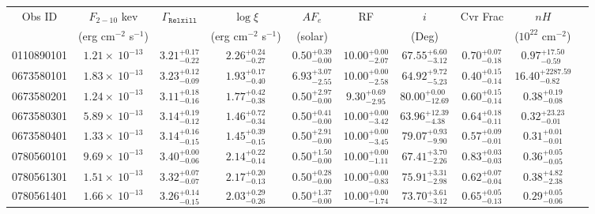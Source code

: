 \documentclass{article}
\begin{document}
\begin{landscape}
\begin{longtable}{cccccccccl}
\hline \multicolumn{1}{c}{Obs ID} & \multicolumn{1}{c}{$F_{2-10}$ kev} & \multicolumn{1}{c}{$\Gamma_\texttt{Relxill}$} & \multicolumn{1}{c}{$\log \xi$} & \multicolumn{1}{c}{$AF_e$} & \multicolumn{1}{c}{RF} & \multicolumn{1}{c}{$\textit{i}$} & \multicolumn{1}{c}{Cvr Frac} & \multicolumn{1}{c}{$nH$}\\  
\multicolumn{1}{c}{} & \multicolumn{1}{c}{(erg cm$^{-2}$ s$^{-1}$)} & \multicolumn{1}{c}{} & \multicolumn{1}{c}{(erg cm$^{-2}$ s$^{-1}$)} & \multicolumn{1}{c}{(solar)} & \multicolumn{1}{c}{} & \multicolumn{1}{c}{(Deg)} & \multicolumn{1}{c}{} & \multicolumn{1}{l}{($10^{22}$ cm$^{-2}$)}\\ \hline 
0110890101 & $1.21 \times~10^{-13}$ & $3.21^{+0.17}_{-0.22}$ & $2.26^{+0.24}_{-0.27}$ & $0.50^{+0.39}_{-0.00}$ & $10.00^{+0.00}_{-2.07}$ & $67.55^{+6.60}_{-3.12}$ &  $0.70^{+0.07}_{-0.18}$ &  $0.97^{+17.50}_{-0.59}$\\
0673580101 & $1.83 \times~10^{-13}$ & $3.23^{+0.12}_{-0.09}$ & $1.93^{+0.17}_{-0.40}$ & $6.93^{+3.07}_{-2.55}$ & $10.00^{+0.00}_{-2.58}$ & $64.92^{+9.72}_{-5.23}$ &  $0.40^{+0.15}_{-0.14}$ &  $16.40^{+2287.59}_{-0.82}$\\
0673580201 & $1.24 \times~10^{-13}$ & $3.11^{+0.18}_{-0.16}$ & $1.77^{+0.42}_{-0.38}$ & $0.50^{+2.97}_{-0.00}$ & $9.30^{+0.69}_{-2.95}$ & $80.00^{+0.00}_{-12.69}$ &  $0.60^{+0.15}_{-0.14}$  &  $0.38^{+0.19}_{-0.08}$\\
0673580301 & $5.89 \times~10^{-13}$ & $3.14^{+0.19}_{-0.12}$ & $1.46^{+0.72}_{-0.34}$ & $0.50^{+0.41}_{-0.00}$ & $10.00^{+0.00}_{-3.42}$ & $63.96^{+12.39}_{-4.38}$ &  $0.64^{+0.18}_{-0.11}$  &  $0.32^{+23.23}_{-0.01}$ \\
0673580401 & $1.33 \times~10^{-13}$ & $3.14^{+0.16}_{-0.15}$ & $1.45^{+0.39}_{-0.15}$ & $0.50^{+2.91}_{-0.00}$ & $10.00^{+0.00}_{-3.45}$ & $79.07^{+0.93}_{-9.90}$ &  $0.57^{+0.09}_{-0.01}$ &  $0.31^{+0.01}_{-0.01}$ \\
0780560101 & $9.69 \times~10^{-13}$ & $3.40^{+0.00}_{-0.06}$ & $2.14^{+0.22}_{-0.14}$ & $0.50^{+1.50}_{-0.00}$ & $10.00^{+0.00}_{-1.11}$ & $67.41^{+3.70}_{-2.26}$ &  $0.83^{+0.03}_{-0.03}$ &  $0.36^{+0.05}_{-0.05}$  \\
0780561301 & $1.51 \times~10^{-13}$ & $3.32^{+0.07}_{-0.07}$ & $2.17^{+0.20}_{-0.13}$ & $0.50^{+0.28}_{-0.00}$ & $10.00^{+0.00}_{-0.83}$ & $75.91^{+3.31}_{-2.98}$ &  $0.62^{+0.07}_{-0.04}$ &  $0.38^{+4.82}_{-2.38}$  \\
0780561401 & $1.66 \times~10^{-13}$ & $3.26^{+0.14}_{-0.15}$ & $2.03^{+0.29}_{-0.26}$ & $0.50^{+1.37}_{-0.00}$ & $10.00^{+0.00}_{-1.74}$ & $73.70^{+3.61}_{-3.12}$ &  $0.65^{+0.05}_{-0.13}$ &  $0.29^{+0.05}_{-0.06}$  \\

\end{longtable}
\end{landscape}
\end{document}
